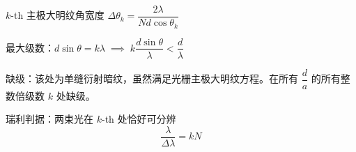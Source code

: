 \documentclass[12pt, a4paper, UTF8, openany]{ctexbook}
\begin{document}
        $k$-th 主极大明纹角宽度 $\Delta\theta_k = \dfrac{2\lambda}{N d \cos\theta_k}$

        最大级数：$d\sin\theta = k\lambda \; \implies \; k \dfrac{d \sin\theta}{\lambda} < \dfrac{d}{\lambda}$

        {\heiti 缺级}：该处为单缝衍射暗纹，虽然满足光栅主极大明纹方程。在所有 $\dfrac{d}{a}$ 的所有整数倍级数 $k$ 处缺级。

        瑞利判据：两束光在 $k$-th 处恰好可分辨
        $$\dfrac{\lambda}{\Delta\lambda} = k N$$
\end{document}
